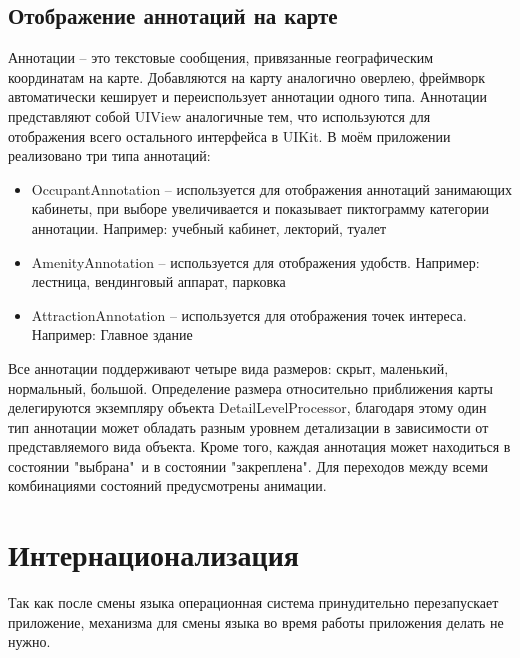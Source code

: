     \subsection{Отображение аннотаций на карте}
      Аннотации -- это текстовые сообщения, привязанные географическим координатам на карте. Добавляются на карту аналогично оверлею, фреймворк автоматически кеширует и переиспользует аннотации одного типа. Аннотации представляют собой UIView аналогичные тем, что используются для отображения всего остального интерфейса в UIKit.
      В моём приложении реализовано три типа аннотаций:
      \begin{itemize}
        \item OccupantAnnotation -- используется для отображения аннотаций занимающих кабинеты, при выборе увеличивается и показывает пиктограмму категории аннотации. Например: учебный кабинет, лекторий, туалет
        \item AmenityAnnotation -- используется для отображения удобств. Например: лестница, вендинговый аппарат, парковка
        \item AttractionAnnotation -- используется для отображения точек интереса. Например: Главное здание
      \end{itemize}


      Все аннотации поддерживают четыре вида размеров: скрыт, маленький, нормальный, большой. Определение размера относительно приближения карты делегируются экземпляру объекта DetailLevelProcessor, благодаря этому один тип аннотации может обладать разным уровнем детализации в зависимости от представляемого вида объекта. Кроме того, каждая аннотация может находиться в состоянии "выбрана"\ и в состоянии "закреплена". Для переходов между всеми комбинациями состояний предусмотрены анимации.


  \section{Интернационализация}
    Так как после смены языка операционная система принудительно перезапускает приложение, механизма для смены языка во время работы приложения делать не нужно.

